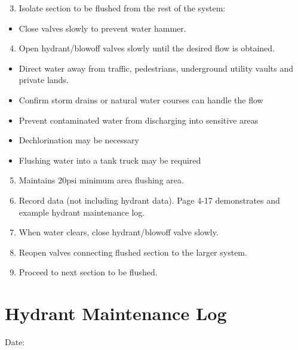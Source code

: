 \documentclass[10pt]{article}
\begin{document}
\begin{enumerate}
  \setcounter{enumi}{2}
  \item Isolate section to be flushed from the rest of the system:
\end{enumerate}
\begin{itemize}
  \item Close valves slowly to prevent water hammer.
\end{itemize}
\begin{enumerate}
  \setcounter{enumi}{3}
  \item Open hydrant/blowoff valves slowly until the desired flow is obtained.
\end{enumerate}
\begin{itemize}
  \item Direct water away from traffic, pedestrians, underground utility vaults and private lands.

  \item Confirm storm drains or natural water courses can handle the flow

  \item Prevent contaminated water from discharging into sensitive areas

  \item Dechlorination may be necessary

  \item Flushing water into a tank truck may be required

\end{itemize}
\begin{enumerate}
  \setcounter{enumi}{4}
  \item Maintains $20 \mathrm{psi}$ minimum area flushing area.

  \item Record data (not including hydrant data). Page 4-17 demonstrates and example hydrant maintenance log.

  \item When water clears, close hydrant/blowoff valve slowly.

  \item Reopen valves connecting flushed section to the larger system.

  \item Proceed to next section to be flushed.

\end{enumerate}
\section{Hydrant Maintenance Log}
Date:
\end{document}

